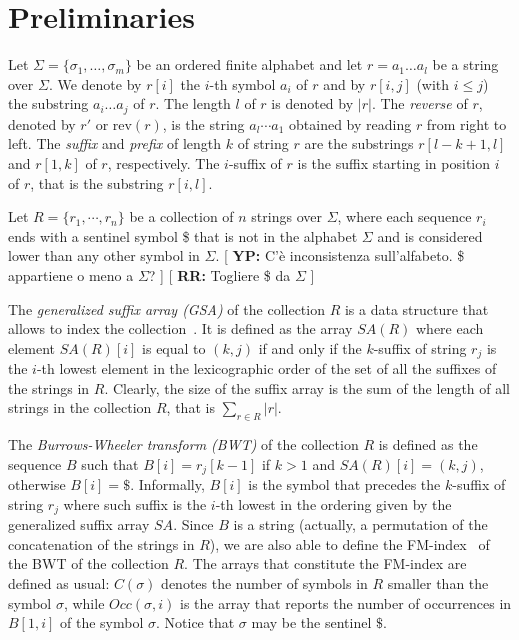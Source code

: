 \documentclass[runningheads,envcountsame,a4paper]{llncs}
\newcommand{\notaestesa}[2]{%
 \marginpar{\color{red!75!black}\textbf{\texttimes}}%
 {\color{red!75!black}%
 [\,\textbullet\,\textsf{\textbf{#1:}} %
 \textsf{\footnotesize#2}\,\textbullet\,]}%
}
\newcommand{\YP}[1]{\notaestesa{YP}{#1}}
\newcommand{\rev}{\ensuremath{\textrm{rev}}}
\newcommand{\SA}{\ensuremath{\textit{SA}}}
\newcommand{\Occ}{\ensuremath{\textit{Occ}}}
\begin{document}
\section{Preliminaries}
Let $\Sigma = \{\sigma_1, \dots, \sigma_m\}$ be an ordered finite
alphabet and let $r = a_1 \dots a_l$ be a string over $\Sigma$.
We denote by $r[i]$ the $i$-th symbol $a_i$ of $r$ and by $r[i,j]$ (with
$i \leq j$) the substring $a_i \dots a_j$ of $r$.
The length $l$ of $r$ is denoted by $|r|$.
The \emph{reverse} of $r$, denoted by $r'$ or $\rev(r)$, is the string
$a_l \cdots a_1$ obtained by reading $r$ from right to left.
The \emph{suffix} and \emph{prefix} of length $k$ of string $r$ are the
substrings $r[l-k +1, l]$ and $r[1, k]$ of $r$, respectively.
The $i$-suffix of $r$ is the suffix starting in position $i$ of $r$,
that is the substring $r[i, l]$.

Let $R = \{r_1, \cdots, r_n\}$ be a collection of $n$ strings over
$\Sigma$, where each sequence $r_i$ ends with a sentinel symbol \$
that is not in the alphabet $\Sigma$ and is considered lower than
any other symbol in $\Sigma$.
\YP{C'è inconsistenza sull'alfabeto. \$ appartiene o meno a $\Sigma$?} \notaestesa{RR}{Togliere \$ da $\Sigma$}
The \emph{generalized suffix array (GSA)} of the collection $R$ is a data
structure that allows to index the collection~\cite{Shi1996}.
It is defined as the array $\SA(R)$ where each element $\SA(R)[i]$ is
equal to $(k, j)$ if and only if the $k$-suffix of string $r_{j}$ is the
$i$-th lowest element in the lexicographic order of the set of all the
suffixes of the strings in $R$.
Clearly, the size of the suffix array is the sum of the length of all
strings in the collection $R$, that is $\sum_{r \in R}|r|$.

The \emph{Burrows-Wheeler transform (BWT)} of the collection $R$ is
defined as the sequence $B$ such that $B[i]=r_{j}[k -1]$ if $k > 1$
and $\SA(R)[i] = (k,j)$, otherwise $B[i]= \$$.
Informally, $B[i]$ is the symbol that precedes the $k$-suffix of
string $r_j$ where such suffix is the $i$-th lowest in the ordering
given by the generalized suffix array $\SA$.
Since $B$ is a string (actually, a permutation of the concatenation of
the strings in $R$), we are also able to define the
FM-index~\cite{Ferragina2005} of the BWT of the collection $R$.
The arrays that constitute the FM-index are defined as usual: $C(\sigma)$ denotes the number of symbols in $R$ smaller than the symbol
$\sigma$, while $\Occ(\sigma, i)$ is the array that reports the number
of occurrences in $B[1, i]$ of the symbol $\sigma$.
Notice that $\sigma$ may be the sentinel $\$$.
\end{document}
